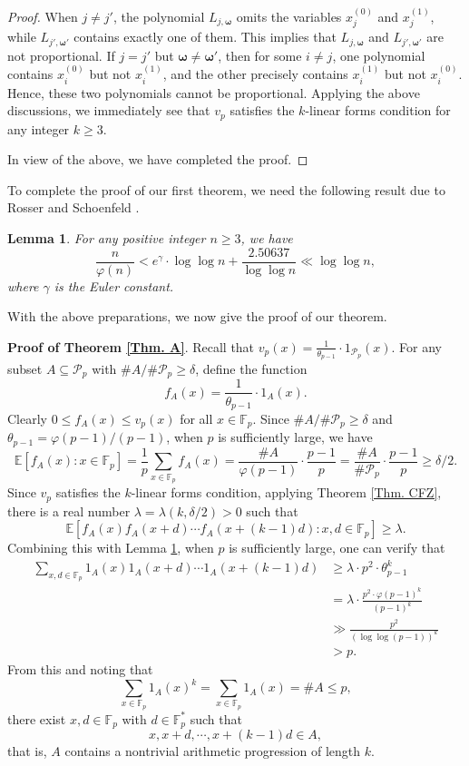 \documentclass[12pt]{amsart}
\theoremstyle{plain}
\newtheorem{lemma}{Lemma}
\theoremstyle{remark}
\begin{document}
\begin{proof}
	When $j\neq j'$, the polynomial $L_{j,{\bm{\omega}}}$ omits the variables $x_j^{(0)}$ and $x_j^{(1)}$, while $L_{j',{\bm{\omega}}'}$ contains exactly one of them. This implies that $L_{j,{\bm{\omega}}}$ and $L_{j',{\bm{\omega}'}}$ are not proportional. If $j=j'$ but $\bm{\omega}\neq \bm{\omega}'$, then for some $i\neq j$, one polynomial contains $x_i^{(0)}$ but not $x_i^{(1)}$, and the other precisely contains $x_i^{(1)}$ but not $x_i^{(0)}$. Hence, these two polynomials cannot be proportional. Applying the above discussions, we immediately see that $v_p$ satisfies the $k$-linear forms condition for any integer $k\ge3$.
		
	In view of the above, we have completed the proof. 
	\end{proof}
	
	To complete the proof of our first theorem, we need the following result due to Rosser and Schoenfeld \cite[Theorem 15]{RS}.
	
	\begin{lemma}\label{Lem. on low bound for theta}
		For any positive integer $n\ge 3$, we have 
		$$\frac{n}{\varphi(n)}<e^{\gamma}\cdot \log\log n+\frac{2.50637}{\log\log n}\ll \log\log n,$$
		where $\gamma$ is the Euler constant. 
	\end{lemma}
	
	
	With the above preparations, we now give the proof of our theorem.
	
	{\noindent\bfseries Proof of Theorem \ref{Thm. A}}. Recall that $v_p(x)=\frac{1}{\theta_{p-1}}\cdot 1_{\mathcal{P}_p}(x)$. For any subset $A\subseteq \mathcal{P}_p$ with $\#A/\#\mathcal{P}_p\ge \delta$, define the function 
	$$f_A(x)=\frac{1}{\theta_{p-1}}\cdot 1_A(x).$$
	Clearly $0\le f_A(x)\le v_p(x)$ for all $x\in\mathbb{F}_p$. Since $\#A/\#\mathcal{P}_p\ge \delta$ and $\theta_{p-1}=\varphi(p-1)/(p-1)$, when $p$ is sufficiently large, we have 
	$$\mathbb{E}\left[f_A(x): x\in\mathbb{F}_p\right]=\frac{1}{p}\sum_{x\in\mathbb{F}_p}f_A(x)=\frac{\#A}{\varphi(p-1)}\cdot\frac{p-1}{p}=\frac{\#A}{\#\mathcal{P}_p}\cdot\frac{p-1}{p}\ge \delta/2.$$
	Since $v_p$ satisfies the $k$-linear forms condition, applying Theorem \ref{Thm. CFZ}, there is a real number $\lambda=\lambda(k,\delta/2)>0$ such that 
	$$\mathbb{E}\left[f_A(x)f_A(x+d)\cdots f_A(x+(k-1)d): x, d\in\mathbb{F}_p\right]\ge \lambda.$$
	Combining this with Lemma \ref{Lem. on low bound for theta}, when $p$ is sufficiently large, one can verify that 
	\begin{align*}
		\sum_{x,d\in\mathbb{F}_p}1_A(x)1_A(x+d)\cdots 1_A(x+(k-1)d)
&\ge \lambda\cdot p^2\cdot \theta_{p-1}^k\\
&=\lambda\cdot \frac{p^2\cdot \varphi(p-1)^k}{(p-1)^k}\\
&\gg \frac{p^2}{(\log\log (p-1))^k}\\
&>p.
	\end{align*}
	From this and noting that 
	$$\sum_{x\in\mathbb{F}_p}1_A(x)^k=\sum_{x\in\mathbb{F}_p}1_A(x)=\#A\le p,$$
	there exist $x,d\in\mathbb{F}_p$ with $d\in\mathbb{F}_p^*$ such that 
	$$x, x+d, \cdots, x+(k-1)d\in A,$$
	that is, $A$ contains a nontrivial arithmetic progression of length $k$. 
	
\end{document}
